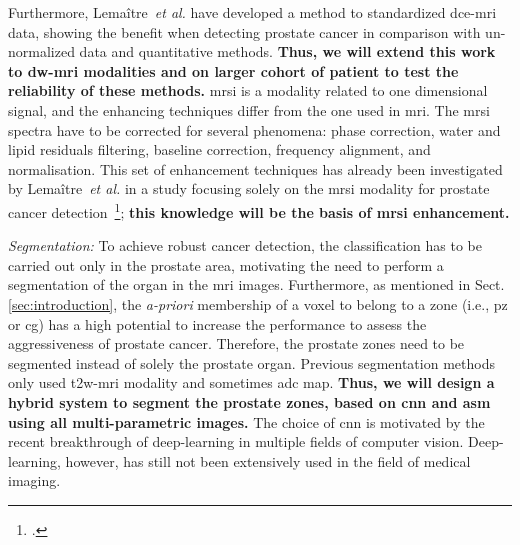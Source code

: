 Furthermore, Lema\^itre~\emph{et al.} have developed a method to standardized \ac{dce}-\ac{mri} data, showing the benefit when detecting prostate cancer in comparison with un-normalized data and quantitative methods.
\textbf{Thus, we will extend this work to \ac{dw}-\ac{mri} modalities and on larger cohort of patient to test the reliability of these methods.}
\ac{mrsi} is a modality related to one dimensional signal, and the enhancing techniques differ from the one used in \ac{mri}.
The \ac{mrsi} spectra have to be corrected for several phenomena: phase correction, water and lipid residuals filtering, baseline correction, frequency alignment, and normalisation.
This set of enhancement techniques has already been investigated by Lema\^itre~\emph{et al.} in a study focusing solely on the \ac{mrsi} modality for prostate cancer detection~\footcite{Lemaitre2011}; \textbf{this knowledge will be the basis of \ac{mrsi} enhancement.}

\emph{Segmentation:}
To achieve robust cancer detection, the classification has to be carried out only in the prostate area, motivating the need to perform a segmentation of the organ in the \ac{mri} images.
Furthermore, as mentioned in Sect.\,\ref{sec:introduction}, the \emph{a-priori} membership of a voxel to belong to a zone (i.e., \ac{pz} or \ac{cg}) has a high potential to increase the performance to assess the aggressiveness of prostate cancer.
Therefore, the prostate zones need to be segmented instead of solely the prostate organ.
Previous segmentation methods only used \ac{t2w}-\ac{mri} modality and sometimes \ac{adc} map.
\textbf{Thus, we will design a hybrid system to segment the prostate zones, based on \ac{cnn} and \ac{asm} using all multi-parametric images.}
The choice of \ac{cnn} is motivated by the recent breakthrough of deep-learning in multiple fields of computer vision.
Deep-learning, however, has still not been extensively used in the field of medical imaging.

